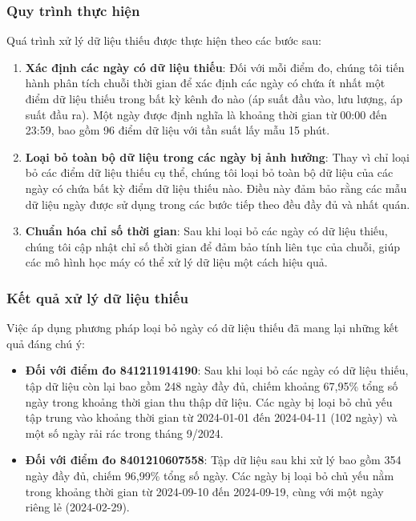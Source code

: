 \subsubsection{Quy trình thực hiện}
Quá trình xử lý dữ liệu thiếu được thực hiện theo các bước sau:

\begin{enumerate}
    \item \textbf{Xác định các ngày có dữ liệu thiếu}: Đối với mỗi điểm đo, chúng tôi tiến hành phân tích chuỗi thời gian để xác định các ngày có chứa ít nhất một điểm dữ liệu thiếu trong bất kỳ kênh đo nào (áp suất đầu vào, lưu lượng, áp suất đầu ra). Một ngày được định nghĩa là khoảng thời gian từ 00:00 đến 23:59, bao gồm 96 điểm dữ liệu với tần suất lấy mẫu 15 phút.
    
    \item \textbf{Loại bỏ toàn bộ dữ liệu trong các ngày bị ảnh hưởng}: Thay vì chỉ loại bỏ các điểm dữ liệu thiếu cụ thể, chúng tôi loại bỏ toàn bộ dữ liệu của các ngày có chứa bất kỳ điểm dữ liệu thiếu nào. Điều này đảm bảo rằng các mẫu dữ liệu ngày được sử dụng trong các bước tiếp theo đều đầy đủ và nhất quán.
    
    \item \textbf{Chuẩn hóa chỉ số thời gian}: Sau khi loại bỏ các ngày có dữ liệu thiếu, chúng tôi cập nhật chỉ số thời gian để đảm bảo tính liên tục của chuỗi, giúp các mô hình học máy có thể xử lý dữ liệu một cách hiệu quả.
\end{enumerate}

\subsubsection{Kết quả xử lý dữ liệu thiếu}
Việc áp dụng phương pháp loại bỏ ngày có dữ liệu thiếu đã mang lại những kết quả đáng chú ý:

\begin{itemize}
    \item \textbf{Đối với điểm đo 841211914190}: Sau khi loại bỏ các ngày có dữ liệu thiếu, tập dữ liệu còn lại bao gồm 248 ngày đầy đủ, chiếm khoảng 67,95\% tổng số ngày trong khoảng thời gian thu thập dữ liệu. Các ngày bị loại bỏ chủ yếu tập trung vào khoảng thời gian từ 2024-01-01 đến 2024-04-11 (102 ngày) và một số ngày rải rác trong tháng 9/2024.
    
    \item \textbf{Đối với điểm đo 8401210607558}: Tập dữ liệu sau khi xử lý bao gồm 354 ngày đầy đủ, chiếm 96,99\% tổng số ngày. Các ngày bị loại bỏ chủ yếu nằm trong khoảng thời gian từ 2024-09-10 đến 2024-09-19, cùng với một ngày riêng lẻ (2024-02-29).
\end{itemize}

